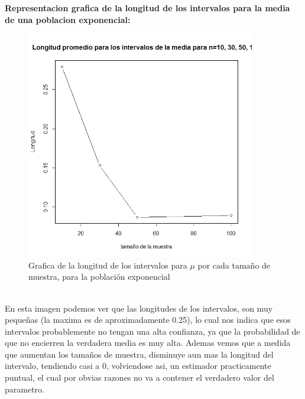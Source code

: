 \documentclass[letterpaper,12pt,onecolumn,titlepage]{article}
\begin{document}
\pagebreak\textbf{Representacion grafica de la longitud de los intervalos para la media de una poblacion exponencial:}
~\\ \begin{figure}[!h]
    \begin{center}
        \includegraphics[width=10cm]{Figuras/P1bM.png}
        \caption{Grafica de la longitud de los intervalos para $\mu$ por cada tama\~{n}o de muestra, para la poblaci\'{o}n exponencial}
        \label{fig:Densidad}
    \end{center}
\end{figure}
~\\ En esta imagen podemos ver que las longitudes de los intervalos, son muy peque\~{n}as (la maxima es de aproximadamente 0.25), lo cual nos indica que esos intervalos probablemente no tengan una alta confianza, ya que la probabilidad de que no encierren la verdadera media es muy alta. Ademas vemos que a medida que aumentan los tama\~{n}os de muestra, disminuye aun mas la longitud del intervalo, tendiendo casi a 0, volviendose asi, un estimador practicamente puntual, el cual por obvias razones no va a contener el verdadero valor del parametro. 
\end{document}
